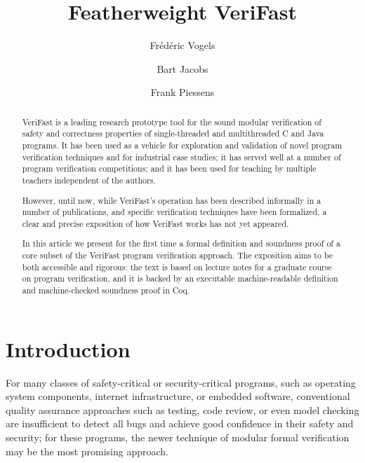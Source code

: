 \documentclass{CSML}
\theoremstyle{definition}\newtheorem{notation}[thm]{Notation}
\theoremstyle{plain}\newtheorem{satz}[thm]{Satz}
\begin{document}
\title[Featherweight VeriFast]{Featherweight VeriFast}

\author[F.~Vogels]{Fr\'ed\'eric Vogels}	\address{iMinds-DistriNet, Dept. C.S., KU Leuven, Celestijnenlaan 200A, 3001 Leuven, Belgium}	  

\author[B.~Jacobs]{Bart Jacobs}	

\author[F.~Piessens]{Frank Piessens}	




\begin{abstract}
  \noindent VeriFast is a leading research prototype tool for the sound modular verification of 
  safety and correctness properties of
  single-threaded and multithreaded C and Java programs. It has been used 
  as a vehicle for exploration and validation of novel program 
  verification techniques and for industrial case studies;
  it has served well at a number of program 
  verification competitions; and it has been used for teaching by multiple teachers independent of the authors.
  
  However, until now, while VeriFast's operation has been described 
  informally in a number of publications, and specific verification techniques have been formalized,
  a clear and precise exposition of how VeriFast works has not 
  yet appeared.
  
  In this article we present for the first time a formal definition and 
  soundness proof of a core subset of the VeriFast program verification 
  approach. The exposition aims to be both accessible and rigorous: the text is 
  based on lecture notes for a graduate course on program verification, 
  and it is backed by an executable machine-readable definition and 
  machine-checked soundness proof in Coq.
\end{abstract}

\maketitle

\section*{Introduction}

For many classes of safety-critical or security-critical programs, such as 
operating system components, internet infrastructure, or embedded 
software, conventional quality assurance approaches such as testing, code 
review, or even model checking are insufficient to detect all bugs and 
achieve good confidence in their safety and security; for these programs, 
the newer technique of modular formal verification may be the most 
promising approach. 
\end{document}
